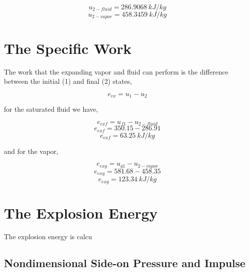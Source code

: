 \documentclass[10pt,parskip=half,
toc=sectionentrywithdots,
bibliography=totocnumbered,
captions=tableheading,numbers=noendperiod]{scrartcl}
\begin{document}
\begin{equation}u_{2-fluid} = 286.9068\:kJ/kg\end{equation}
\begin{equation}u_{2-vapor} = 458.3459\:kJ/kg\end{equation}

\hypertarget{the-specific-work}{%
\section{The Specific Work}\label{the-specific-work}}

The work that the expanding vapor and fluid can perform is the
difference between the initial (1) and final (2) states,

\begin{equation}e_{ex} = u_1 - u_2\end{equation}

for the saturated fluid we have,

\begin{equation}e_{exf} = u_{f1} - u_{2-fluid}\end{equation}
\begin{equation}e_{exf} = 350.15 - 286.91\end{equation}
\begin{equation}e_{exf} = 63.25\:kJ/kg\end{equation}

and for the vapor,

\begin{equation}e_{exg} = u_{g1} - u_{2-vapor}\end{equation}
\begin{equation}e_{exg} = 581.68 - 458.35\end{equation}
\begin{equation}e_{exg} = 123.34\:kJ/kg\end{equation}

\hypertarget{the-explosion-energy}{%
\section{The Explosion Energy}\label{the-explosion-energy}}

The explosion energy is calcu

\hypertarget{nondimensional-side-on-pressure-and-impulse}{%
\subsection{Nondimensional Side-on Pressure and
Impulse}\label{nondimensional-side-on-pressure-and-impulse}}
\end{document}
